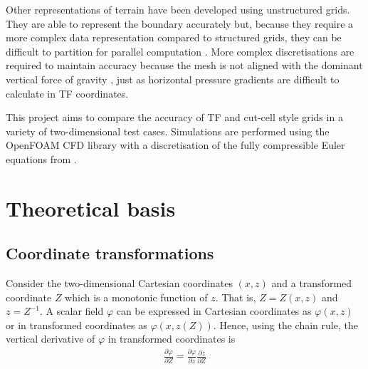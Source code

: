 Other representations of terrain have been developed using unstructured grids.  They are able to represent the boundary accurately but, because they require a more complex data representation compared to structured grids, they can be difficult to partition for parallel computation \autocite{steppeler2003}.  More complex discretisations are required to maintain accuracy because the mesh is not aligned with the dominant vertical force of gravity \autocite{rosatti2005}, just as horizontal pressure gradients are difficult to calculate in TF coordinates.  



This project aims to compare the accuracy of TF and cut-cell style grids in a variety of two-dimensional test cases.  Simulations are performed using the OpenFOAM CFD library \autocite{openfoam} with a discretisation of the fully compressible Euler equations from \textcite{weller-shahrokhi2014}.  


\chapter{Theoretical basis}



\section{Coordinate transformations}
Consider the two-dimensional Cartesian coordinates $(x, z)$ and a transformed coordinate $Z$ which is a monotonic function of $z$.  That is, $Z = Z(x, z)$ and $z = Z^{-1}$.  A scalar field $\varphi$ can be expressed in Cartesian coordinates as $\varphi(x, z)$ or in transformed coordinates as $\varphi(x, z(Z))$.
Hence, using the chain rule, the vertical derivative of $\varphi$ in transformed coordinates is
\begin{align}
\frac{\partial \varphi}{\partial Z} =
  \frac{\partial \varphi}{\partial z}
  \frac{\partial z}{\partial Z}
  \label{eq:coord:vertical}
\end{align}

